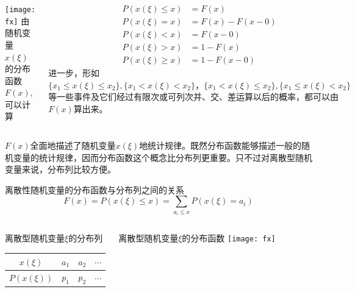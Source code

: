\begin{frame}
\begin{columns}
	\texttt{[image: fx]}
	由随机变量$x(\xi)$的分布函数$F(x)$, 可以计算
	\begin{block}{}
		\begin{align*}
		P(x(\xi)\le x) &= F(x)\\
		P(x(\xi) = x) &= F(x)-F(x-0) \\
		P(x(\xi) < x) &= F(x-0) \\
		P(x(\xi) > x) &= 1- F(x) \\
		P(x(\xi) \ge x) &= 1-F(x-0)
		\end{align*}
		进一步，形如$\{x_1\le x(\xi)\le x_2\},\{x_1< x(\xi)< x_2\}，\{x_1< x(\xi)\le x_2\}, \{x_1\le x(\xi)< x_2\}$等一些事件及它们经过有限次或可列次并、交、差运算以后的概率，都可以由$F(x)$算出来。
	\end{block}
 \end{columns}
\begin{block}{}
	$F(x)$全面地描述了随机变量$x(\xi)$地统计规律。既然分布函数能够描述一般的随机变量的统计规律，因而分布函数这个概念比分布列更重要。只不过对离散型随机变量来说，分布列比较方便。
\end{block}
\end{frame}

\begin{frame}{离散性随机变量的分布函数与分布列之间的关系}
\[F(x)=P(x(\xi)\le x)= \sum_{a_i\le x}P(x(\xi)=a_i)\]
\begin{columns}
	\begin{block}{离散型随机变量$\xi$的分布列}
		\begin{tabular}{|c|c|c|c|}
			\hline 
			$x(\xi)$    & $a_1$ & $a_2$ & $\cdots$\\ 
			\hline 
			$P(x(\xi))$ & $p_1$ & $p_2$ & $\cdots$\\ 
			\hline 
		\end{tabular} 
	\end{block}
	\begin{block}{离散型随机变量$\xi$的分布函数}
		\texttt{[image: fx]}
	\end{block}
\end{columns}
\end{frame}


